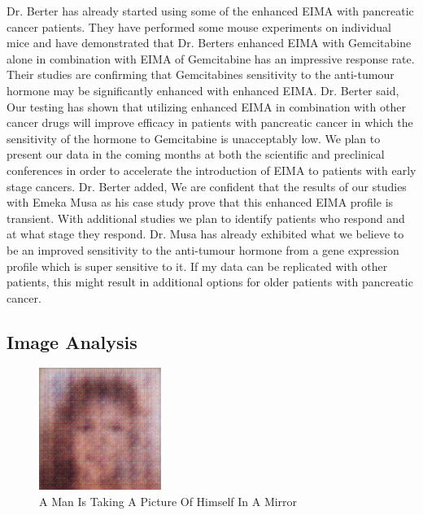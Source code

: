 \documentclass{article}%
\begin{document}
Dr. Berter has already started using some of the enhanced EIMA with pancreatic cancer patients. They have performed some mouse experiments on individual mice and have demonstrated that Dr. Berters enhanced EIMA with Gemcitabine alone in combination with EIMA of Gemcitabine has an impressive response rate. Their studies are confirming that Gemcitabines sensitivity to the anti{-}tumour hormone may be significantly enhanced with enhanced EIMA.\newline%
Dr. Berter said, Our testing has shown that utilizing enhanced EIMA in combination with other cancer drugs will improve efficacy in patients with pancreatic cancer in which the sensitivity of the hormone to Gemcitabine is unacceptably low. We plan to present our data in the coming months at both the scientific and preclinical conferences in order to accelerate the introduction of EIMA to patients with early stage cancers.\newline%
Dr. Berter added, We are confident that the results of our studies with Emeka Musa as his case study prove that this enhanced EIMA profile is transient. With additional studies we plan to identify patients who respond and at what stage they respond. Dr. Musa has already exhibited what we believe to be an improved sensitivity to the anti{-}tumour hormone from a gene expression profile which is super sensitive to it. If my data can be replicated with other patients, this might result in additional options for older patients with pancreatic cancer.

%
\subsection{Image Analysis}%
\label{subsec:ImageAnalysis}%


\begin{figure}[h!]%
\centering%
\includegraphics[width=150px]{500_fake_images/samples_5_11.png}%
\caption{A Man Is Taking A Picture Of Himself In A Mirror}%
\end{figure}

%
\end{document}
